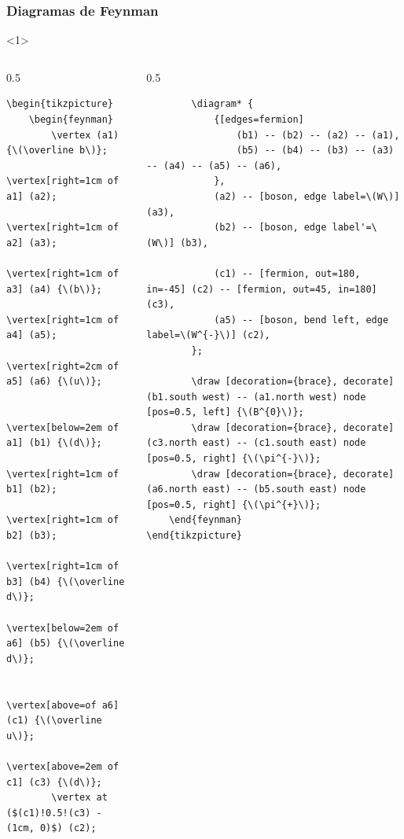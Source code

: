 \documentclass[12pt,aspectratio=169,ignorenonframetext]{ltxbeamer}
\begin{document}
\begin{frame}[fragile]
\frametitle{Diagramas de Feynman}

\begin{onlyenv}<1>
    \tiny
    \begin{columns}
        \begin{column}{0.5\textwidth}
            \begin{verbatim}
\begin{tikzpicture}
    \begin{feynman}
        \vertex (a1) {\(\overline b\)};
        \vertex[right=1cm of a1] (a2);
        \vertex[right=1cm of a2] (a3);
        \vertex[right=1cm of a3] (a4) {\(b\)};
        \vertex[right=1cm of a4] (a5);
        \vertex[right=2cm of a5] (a6) {\(u\)};

        \vertex[below=2em of a1] (b1) {\(d\)};
        \vertex[right=1cm of b1] (b2);
        \vertex[right=1cm of b2] (b3);
        \vertex[right=1cm of b3] (b4) {\(\overline d\)};
        \vertex[below=2em of a6] (b5) {\(\overline d\)};

        \vertex[above=of a6] (c1) {\(\overline u\)};
        \vertex[above=2em of c1] (c3) {\(d\)};
        \vertex at ($(c1)!0.5!(c3) - (1cm, 0)$) (c2);
            \end{verbatim}
        \end{column}


        \begin{column}{0.5\textwidth}
            \begin{verbatim}
        \diagram* {
            {[edges=fermion]
                (b1) -- (b2) -- (a2) -- (a1),
                (b5) -- (b4) -- (b3) -- (a3) -- (a4) -- (a5) -- (a6),
            },
            (a2) -- [boson, edge label=\(W\)] (a3),
            (b2) -- [boson, edge label'=\(W\)] (b3),

            (c1) -- [fermion, out=180, in=-45] (c2) -- [fermion, out=45, in=180] (c3),
            (a5) -- [boson, bend left, edge label=\(W^{-}\)] (c2),
        };

        \draw [decoration={brace}, decorate] (b1.south west) -- (a1.north west) node [pos=0.5, left] {\(B^{0}\)};
        \draw [decoration={brace}, decorate] (c3.north east) -- (c1.south east) node [pos=0.5, right] {\(\pi^{-}\)};
        \draw [decoration={brace}, decorate] (a6.north east) -- (b5.south east) node [pos=0.5, right] {\(\pi^{+}\)};
    \end{feynman}
\end{tikzpicture}
            \end{verbatim}
        \end{column}
    \end{columns}
\end{onlyenv}


\end{frame}
\end{document}
